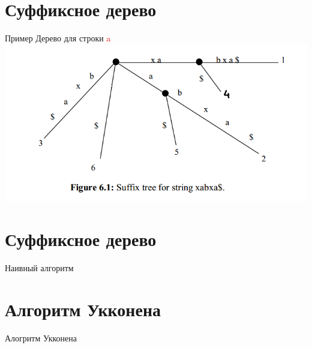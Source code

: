 \documentclass[10pt]{beamer}
\begin{document}
\section{Суффиксное дерево}
\begin{frame}[fragile]{Пример}
Дерево для строки \textcolor{red}{a}
\includegraphics[scale=0.5]{Term_3/Source/Pictures/Suff_Tree.png}
\end{frame}

\section{Суффиксное дерево}
\begin{frame}[fragile]{Наивный алгоритм}
\end{frame}

\section{Алгоритм Укконена}
\begin{frame}[fragile]{Алогритм Укконена}
\end{frame}
\end{document}
